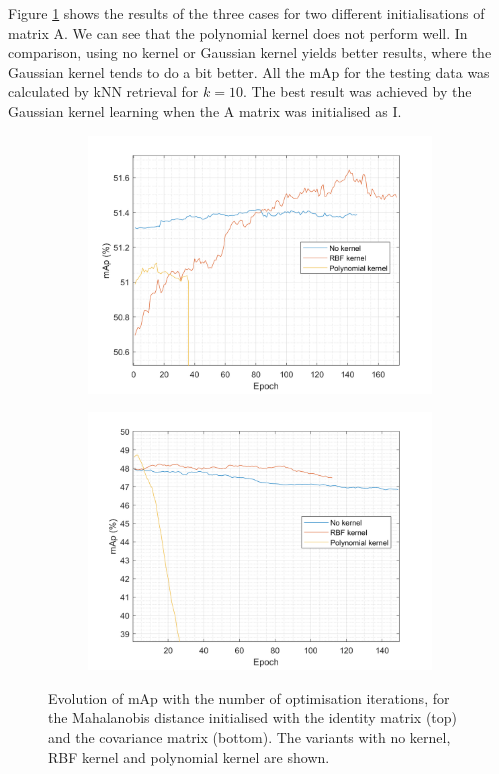 \documentclass[10pt,technote]{IEEEtran}
\begin{document}
Figure \ref{fig:comparison_init} shows the results of the three cases for two different initialisations of matrix A. We can see that the polynomial kernel does not perform well. In comparison, using no kernel or Gaussian kernel yields better results, where  the Gaussian kernel tends to do a bit better.
All the mAp for the testing data was calculated by kNN retrieval for $k = 10$.
The best result was achieved by the Gaussian kernel learning when the A matrix was initialised as I.

\begin{figure}
\begin{subfigure}{\linewidth}
    \centering
    \includegraphics[width=\linewidth]{Graphs/I_init_comparison.png}
    
    
\end{subfigure}
\begin{subfigure}{\linewidth}
    \centering
    \includegraphics[width=\linewidth]{Graphs/cov_init_comparison.png}
\end{subfigure}
\caption{Evolution of mAp with the number of optimisation iterations, for the Mahalanobis distance initialised with the identity matrix (top) and the covariance matrix (bottom). The variants with no kernel, RBF kernel and polynomial kernel are shown.}
\label{fig:comparison_init}
\end{figure}
\end{document}
